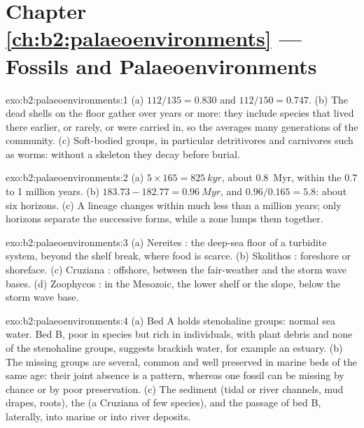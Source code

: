 \section*{Chapter \ref{ch:b2:palaeoenvironments} --- Fossils and Palaeoenvironments}

\begin{solution}{exo:b2:palaeoenvironments:1}
(a) $112/135 = 0.830$ and $112/150 = 0.747$. (b) The dead shells on the floor gather over years
or more: they include species that lived there earlier, or rarely, or were carried in, so the
 averages many generations of the community. (c) Soft-bodied groups, in
particular detritivores and carnivores such as worms: without a skeleton they decay before burial.
\end{solution}

\begin{solution}{exo:b2:palaeoenvironments:2}
(a) $5 \times 165 = \qty{825}{kyr}$, about \qty{0.8}{Myr}, within the 0.7 to 1 million years.
(b) $183.73 - 182.77 = \qty{0.96}{Myr}$, and $0.96/0.165 = 5.8$: about six horizons. (c) A
lineage changes within much less than a million years; only horizons separate the successive
forms, while a zone lumps them together.
\end{solution}

\begin{solution}{exo:b2:palaeoenvironments:3}
(a) Nereites : the deep-sea floor of a turbidite system, beyond the shelf break, where
food is scarce. (b) Skolithos : foreshore or shoreface. (c) Cruziana :
offshore, between the fair-weather and the storm wave bases. (d) Zoophycos : in the
Mesozoic, the lower shelf or the slope, below the storm wave base.
\end{solution}

\begin{solution}{exo:b2:palaeoenvironments:4}
(a) Bed A holds stenohaline groups: normal sea water. Bed B, poor in species but rich in
individuals, with plant debris and none of the stenohaline groups, suggests brackish water, for
example an estuary. (b) The missing groups are several, common and well preserved in marine beds
of the same age: their joint absence is a pattern, whereas one fossil can be missing by chance or
by poor preservation. (c) The sediment (tidal or river channels, mud drapes, roots), the  (a Cruziana  of few species), and the passage of bed B, laterally, into
marine or into river deposits.
\end{solution}

